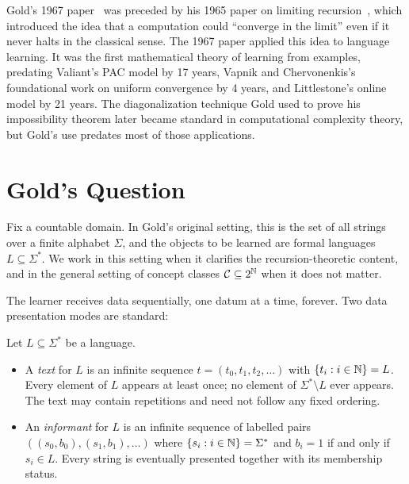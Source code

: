 \begin{historical}
Gold's 1967 paper~\cite{Gold1967} was preceded by his 1965 paper on limiting recursion~\cite{Gold1965}, which introduced the idea that a computation could ``converge in the limit'' even if it never halts in the classical sense. The 1967 paper applied this idea to language learning. It was the first mathematical theory of learning from examples, predating Valiant's PAC model by 17 years, Vapnik and Chervonenkis's foundational work on uniform convergence by 4 years, and Littlestone's online model by 21 years. The diagonalization technique Gold used to prove his impossibility theorem later became standard in computational complexity theory, but Gold's use predates most of those applications.
\end{historical}


\section{Gold's Question}
\label{sec:gold-question}

Fix a countable domain. In Gold's original setting, this is the set of all strings over a finite alphabet $\Sigma$, and the objects to be learned are formal languages $L \subseteq \Sigma^*$. We work in this setting when it clarifies the recursion-theoretic content, and in the general setting of concept classes $\mathcal{C} \subseteq 2^{\mathbb{N}}$ when it does not matter.

The learner receives data sequentially, one datum at a time, forever. Two data presentation modes are standard:

\begin{defn}
\label{def:text-informant}
Let $L \subseteq \Sigma^*$ be a language.
\begin{itemize}[leftmargin=*,itemsep=2pt]
\item A \emph{text} for $L$ is an infinite sequence $t = (t_0, t_1, t_2, \ldots)$ with $\{t_i : i \in \mathbb{N}\} = L$. Every element of $L$ appears at least once; no element of $\Sigma^* \setminus L$ ever appears. The text may contain repetitions and need not follow any fixed ordering.
\item An \emph{informant} for $L$ is an infinite sequence of labelled pairs $((s_0, b_0), (s_1, b_1), \ldots)$ where $\{s_i : i \in \mathbb{N}\} = \Sigma^*$ and $b_i = 1$ if and only if $s_i \in L$. Every string is eventually presented together with its membership status.
\end{itemize}
\end{defn}

